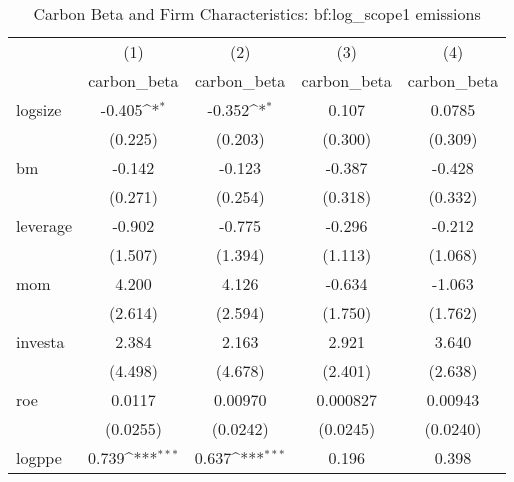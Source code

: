 \begin{table}[htbp]\centering
\def\sym#1{\ifmmode^{#1}\else\(^{#1}\)\fi}
\caption{Carbon Beta and Firm Characteristics: {bf:log\_scope1 emissions}}
\begin{tabular}{l*{4}{c}}
\hline\hline
                    &\multicolumn{1}{c}{(1)}&\multicolumn{1}{c}{(2)}&\multicolumn{1}{c}{(3)}&\multicolumn{1}{c}{(4)}\\
                    &\multicolumn{1}{c}{carbon\_beta}&\multicolumn{1}{c}{carbon\_beta}&\multicolumn{1}{c}{carbon\_beta}&\multicolumn{1}{c}{carbon\_beta}\\
\hline
logsize             &      -0.405\sym{*}  &      -0.352\sym{*}  &       0.107         &      0.0785         \\
                    &     (0.225)         &     (0.203)         &     (0.300)         &     (0.309)         \\
[1em]
bm                  &      -0.142         &      -0.123         &      -0.387         &      -0.428         \\
                    &     (0.271)         &     (0.254)         &     (0.318)         &     (0.332)         \\
[1em]
leverage            &      -0.902         &      -0.775         &      -0.296         &      -0.212         \\
                    &     (1.507)         &     (1.394)         &     (1.113)         &     (1.068)         \\
[1em]
mom                 &       4.200         &       4.126         &      -0.634         &      -1.063         \\
                    &     (2.614)         &     (2.594)         &     (1.750)         &     (1.762)         \\
[1em]
investa             &       2.384         &       2.163         &       2.921         &       3.640         \\
                    &     (4.498)         &     (4.678)         &     (2.401)         &     (2.638)         \\
[1em]
roe                 &      0.0117         &     0.00970         &    0.000827         &     0.00943         \\
                    &    (0.0255)         &    (0.0242)         &    (0.0245)         &    (0.0240)         \\
[1em]
logppe              &       0.739\sym{***}&       0.637\sym{***}&       0.196         &       0.398         \\

\end{tabular}
\end{table}

